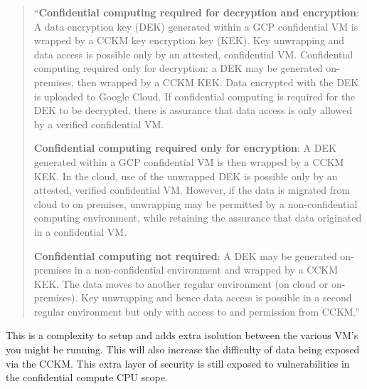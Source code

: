 \begin{quote}
“\textbf{Confidential computing required for decryption and encryption}: 
A data encryption key (DEK) generated within a GCP confidential VM is wrapped by a CCKM key encryption key (KEK). Key unwrapping and data access is possible only by an attested, confidential VM.
Confidential computing required only for decryption: a DEK may be generated on-premises, then wrapped by a CCKM KEK. Data encrypted with the DEK is uploaded to Google Cloud. If confidential computing is required for the DEK to be decrypted, there is assurance that data access is only allowed by a verified confidential VM.

\textbf{Confidential computing required only for encryption}: A DEK generated within a GCP confidential VM is then wrapped by a CCKM KEK. In the cloud, use of the unwrapped DEK is possible only by an attested, verified confidential VM. However, if the data is migrated from cloud to on premises, unwrapping may be permitted by a non-confidential computing environment, while retaining the assurance that data originated in a confidential VM.

\textbf{Confidential computing not required}: A DEK may be generated on- premises in a non-confidential environment and wrapped by a CCKM KEK. The data moves to another regular environment (on cloud or on-premises). Key unwrapping and hence data access is possible in a second regular environment but only with access to and permission from CCKM.” 
\end{quote}

This is a complexity to setup and adds extra isolution 
between the various VM’s you might be running. 
This will also increase the difficulty of data being exposed via the CCKM. 
This extra layer of security is still exposed to vulnerabilities 
in the confidential compute CPU scope.
